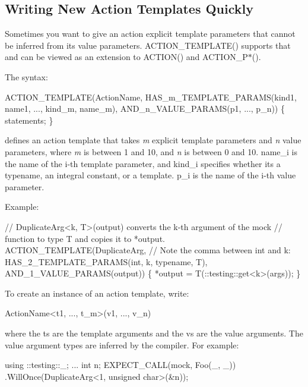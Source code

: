 \subsection*{Writing New Action Templates Quickly}

Sometimes you want to give an action explicit template parameters that cannot be inferred from its value parameters. {\ttfamily A\+C\+T\+I\+O\+N\+\_\+\+T\+E\+M\+P\+L\+A\+T\+E()} supports that and can be viewed as an extension to {\ttfamily A\+C\+T\+I\+O\+N()} and {\ttfamily A\+C\+T\+I\+O\+N\+\_\+\+P$\ast$()}.

The syntax\+: 
\begin{DoxyCode}
ACTION\_TEMPLATE(ActionName,
                HAS\_m\_TEMPLATE\_PARAMS(kind1, name1, ..., kind\_m, name\_m),
                AND\_n\_VALUE\_PARAMS(p1, ..., p\_n)) \{ statements; \}
\end{DoxyCode}


defines an action template that takes {\itshape m} explicit template parameters and {\itshape n} value parameters, where {\itshape m} is between 1 and 10, and {\itshape n} is between 0 and 10. {\ttfamily name\+\_\+i} is the name of the i-\/th template parameter, and {\ttfamily kind\+\_\+i} specifies whether it\textquotesingle{}s a {\ttfamily typename}, an integral constant, or a template. {\ttfamily p\+\_\+i} is the name of the i-\/th value parameter.

Example\+: 
\begin{DoxyCode}
\textcolor{comment}{// DuplicateArg<k, T>(output) converts the k-th argument of the mock}
\textcolor{comment}{// function to type T and copies it to *output.}
ACTION\_TEMPLATE(DuplicateArg,
                \textcolor{comment}{// Note the comma between int and k:}
                HAS\_2\_TEMPLATE\_PARAMS(\textcolor{keywordtype}{int}, k, \textcolor{keyword}{typename}, T),
                AND\_1\_VALUE\_PARAMS(output)) \{
  *output = T(::testing::get<k>(args));
\}
\end{DoxyCode}


To create an instance of an action template, write\+: 
\begin{DoxyCode}
ActionName<t1, ..., t\_m>(v1, ..., v\_n)
\end{DoxyCode}
 where the {\ttfamily t}s are the template arguments and the {\ttfamily v}s are the value arguments. The value argument types are inferred by the compiler. For example\+: 
\begin{DoxyCode}
using ::testing::\_;
...
  \textcolor{keywordtype}{int} n;
  EXPECT\_CALL(mock, Foo(\_, \_))
      .WillOnce(DuplicateArg<1, unsigned char>(&n));
\end{DoxyCode}


